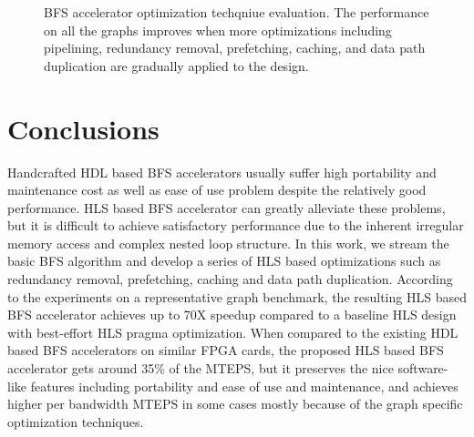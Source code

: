 \begin{figure}
    \caption{BFS accelerator optimization techqniue evaluation. The performance on 
    all the graphs improves when more optimizations including pipelining, 
    redundancy removal, prefetching, caching, and data path duplication are 
    gradually applied to the design.}
\label{fig:opt-performance}
\end{figure}

\section{Conclusions} \label{sec:conclusion}
Handcrafted HDL based BFS accelerators usually suffer high portability and maintenance cost 
as well as ease of use problem despite the relatively 
good performance. HLS based BFS accelerator can greatly alleviate these problems, but it is 
difficult to achieve satisfactory performance due to the inherent irregular memory access and 
complex nested loop structure. In this work, we stream the basic BFS algorithm and develop 
a series of HLS based optimizations such as redundancy removal, prefetching, caching and 
data path duplication. According to the experiments on 
a representative graph benchmark, the resulting HLS based BFS accelerator achieves up to 70X speedup 
compared to a baseline HLS design with best-effort HLS pragma optimization. When compared to the 
existing HDL based BFS accelerators on similar FPGA cards, the proposed HLS based BFS accelerator 
gets around 35\% of the MTEPS, but it preserves the nice software-like features including 
portability and ease of use and maintenance, and achieves higher per bandwidth MTEPS in some cases 
mostly because of the graph specific optimization techniques. 

